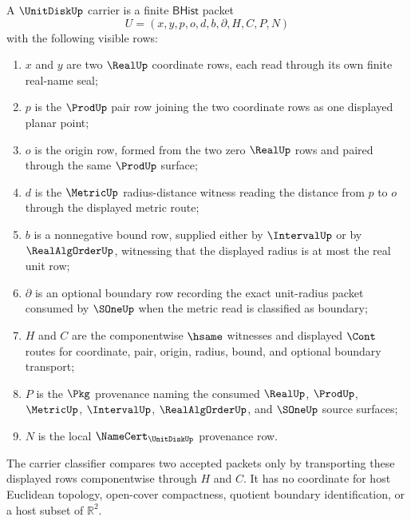 \begin{definition}
\label{def:unitdisk-bhist-carrier}
A $\UnitDiskUp$ carrier is a finite $\mathsf{BHist}$ packet
$$
U=(x,y,p,o,d,b,\partial,H,C,P,N)
$$
with the following visible rows:
\begin{enumerate}
\item $x$ and $y$ are two $\RealUp$ coordinate rows, each read through its own finite real-name seal;
\item $p$ is the $\ProdUp$ pair row joining the two coordinate rows as one displayed planar point;
\item $o$ is the origin row, formed from the two zero $\RealUp$ rows and paired through the same $\ProdUp$ surface;
\item $d$ is the $\MetricUp$ radius-distance witness reading the distance from $p$ to $o$ through the displayed metric route;
\item $b$ is a nonnegative bound row, supplied either by $\IntervalUp$ or by $\RealAlgOrderUp$, witnessing that the displayed radius is at most the real unit row;
\item $\partial$ is an optional boundary row recording the exact unit-radius packet consumed by $\SOneUp$ when the metric read is classified as boundary;
\item $H$ and $C$ are the componentwise $\hsame$ witnesses and displayed $\Cont$ routes for coordinate, pair, origin, radius, bound, and optional boundary transport;
\item $P$ is the $\Pkg$ provenance naming the consumed $\RealUp$, $\ProdUp$, $\MetricUp$, $\IntervalUp$, $\RealAlgOrderUp$, and $\SOneUp$ source surfaces;
\item $N$ is the local $\NameCert_{\UnitDiskUp}$ provenance row.
\end{enumerate}
The carrier classifier compares two accepted packets only by transporting these displayed rows componentwise through $H$ and $C$. It has no coordinate for host Euclidean topology, open-cover compactness, quotient boundary identification, or a host subset of $\mathbb{R}^2$.
\end{definition}

